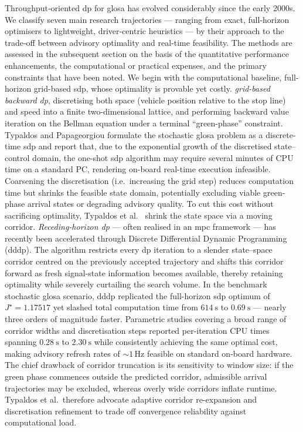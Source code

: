 Throughput‐oriented \ac{dp} for \ac{glosa} has evolved considerably since the early 2000s. We classify seven main research trajectories --- ranging from exact, full‐horizon optimisers to lightweight, driver‐centric heuristics --- by their approach to the trade‐off between advisory optimality and real‐time feasibility. The methods are assessed in the subsequent section on the basis of the quantitative performance enhancements, the computational or practical expenses, and the primary constraints that have been noted.
\mynewline
We begin with the computational baseline, full-horizon grid-based \ac{sdp}, whose optimality is provable yet costly. \emph{grid-based backward \ac{dp}}, discretising both space (vehicle position relative to the stop line) and speed into a finite two-dimensional lattice, and performing backward value iteration on the Bellman equation under a terminal “green-phase” constraint. Typaldos and Papageorgiou \cite{Typaldos2021} formulate the stochastic \ac{glosa} problem as a discrete-time \ac{sdp} and report that, due to the exponential growth of the discretised state–control domain, the one-shot \ac{sdp} algorithm may require several minutes of CPU time on a standard PC, rendering on-board real-time execution infeasible. Coarsening the discretisation (i.e.\ increasing the grid step) reduces computation time but shrinks the feasible state domain, potentially excluding viable green-phase arrival states or degrading advisory quality.
\mynewline
To cut this cost without sacrificing optimality, Typaldos et al.~\cite{Typaldos2023} shrink the state space via a moving corridor. \textit{Receding‐horizon \ac{dp}} --- often realised in an \ac{mpc} framework --- has recently been accelerated through Discrete Differential Dynamic Programming (\ac{dddp}). The algorithm restricts every \ac{dp} iteration to a slender state–space corridor centred on the previously accepted trajectory and shifts this corridor forward as fresh signal-state information becomes available, thereby retaining optimality while severely curtailing the search volume. In the benchmark stochastic \ac{glosa} scenario, \ac{dddp} replicated the full-horizon \ac{sdp} optimum of $J^\star=1.17517$ yet slashed total computation time from $614\ \mathrm{s}$ to $0.69\ \mathrm{s}$ --- nearly three orders of magnitude faster. Parametric studies covering a broad range of corridor widths and discretisation steps reported per-iteration CPU times spanning $0.28\ \mathrm{s}$ to $2.30\ \mathrm{s}$ while consistently achieving the same optimal cost, making advisory refresh rates of \(\sim1\,\text{Hz}\) feasible on standard on-board hardware. The chief drawback of corridor truncation is its sensitivity to window size: if the green phase commences outside the predicted corridor, admissible arrival trajectories may be excluded, whereas overly wide corridors inflate runtime. Typaldos et al.\ therefore advocate adaptive corridor re-expansion and discretisation refinement to trade off convergence reliability against computational load. 
